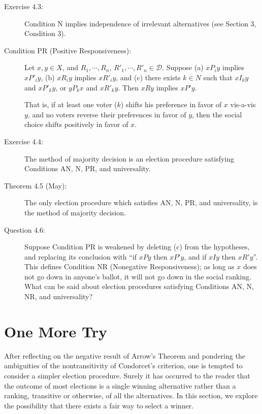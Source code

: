 \documentclass{article}
\begin{document}
\begin{description}

\item[Exercise 4.3:] Condition N implies independence of irrelevant alternatives (see Section 3, Condition 3).

\item[Condition PR (Positive Responsiveness):] Let $x,y \in X$, and $R_{1},\cdots,R_{n}$, $R'_{1},\cdots,R'_{n} \in \mathcal{D}$. Suppose (a) $xP_{i}y$ implies $xP'_{i}y$, (b) $xR_{i}y$ implies $xR'_{i}y$, and (c) there exists $k \in N$ such that $xI_{k}y$ and $xP'_{k}y$, or $yP_{k}x$ and $xR'_{k}y$. Then $xRy$ implies $xP'y$.

  That is, if at least one voter ($k$) shifts his preference in favor of $x$ vis-a-vis $y$, and no voters reverse their preferences in favor of $y$, then the social choice shifts positively in favor of $x$.

\item[Exercise 4.4:] The method of majority decision is an election procedure satisfying Conditions AN, N, PR, and universality.

\item[Theorem 4.5 (May):] The only election procedure which satisfies AN, N, PR, and universality, is the method of majority decision.

\item[Question 4.6:] Suppose Condition PR is weakened by deleting (c) from the hypotheses, and replacing its conclusion with ``if $xPy$ then $xP'y$, and if $xIy$ then $xR'y$''. This defines Condition NR (Nonegative Responsiveness); as long as $x$ does not go down in anyone's ballot, it will not go down in the social ranking. What can be said about election procedures satisfying Conditions AN, N, NR, and universality?


\end{description}



\section{One More Try}

After reflecting on the negative result of Arrow's Theorem and pondering the ambiguities of the nontransitivity of Condorcet's criterion, one is tempted to consider a simpler election procedure. Surely it has occurred to the reader that the outcome of most elections is a single winning alternative rather than a ranking, transitive or otherwise, of all the alternatives. In this section, we explore the possibility that there exists a fair way to select a winner.
\end{document}

